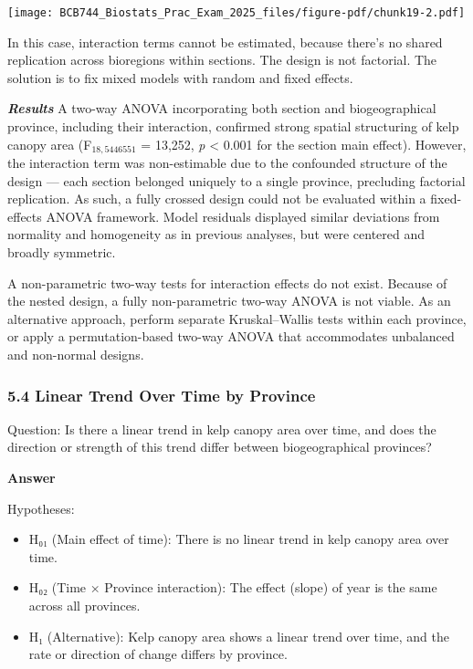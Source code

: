 \documentclass[
  british,
  10pt,
]{article}
\providecommand{\tightlist}{%
  \setlength{\itemsep}{0pt}\setlength{\parskip}{0pt}}
\let\oldtexttt\texttt
\renewcommand{\texttt}[1]{\oldtexttt{\small #1}}
\begin{document}
\begin{center}
\texttt{[image: BCB744\_Biostats\_Prac\_Exam\_2025\_files/figure-pdf/chunk19-2.pdf]}
\end{center}

In this case, interaction terms cannot be estimated, because there's no
shared replication across bioregions within sections. The design is not
factorial. The solution is to fix mixed models with random and fixed
effects.

\textbf{\emph{Results}} A two-way ANOVA incorporating both section and
biogeographical province, including their interaction, confirmed strong
spatial structuring of kelp canopy area (F\(_{18,5446551}\) = 13,252,
\emph{p} \textless{} 0.001 for the section main effect). However, the
interaction term was non-estimable due to the confounded structure of
the design --- each section belonged uniquely to a single province,
precluding factorial replication. As such, a fully crossed design could
not be evaluated within a fixed-effects ANOVA framework. Model residuals
displayed similar deviations from normality and homogeneity as in
previous analyses, but were centered and broadly symmetric.

A non-parametric two-way tests for interaction effects do not exist.
Because of the nested design, a fully non-parametric two-way ANOVA is
not viable. As an alternative approach, perform separate Kruskal--Wallis
tests within each province, or apply a permutation-based two-way ANOVA
that accommodates unbalanced and non-normal designs.

\subsubsection{5.4 Linear Trend Over Time by
Province}\label{linear-trend-over-time-by-province}

Question: Is there a linear trend in kelp canopy area over time, and
does the direction or strength of this trend differ between
biogeographical provinces?

\textbf{Answer}

Hypotheses:

\begin{itemize}
\tightlist
\item
  H₀₁ (Main effect of time): There is no linear trend in kelp canopy
  area over time.
\item
  H₀₂ (Time × Province interaction): The effect (slope) of year is the
  same across all provinces.
\item
  H₁ (Alternative): Kelp canopy area shows a linear trend over time, and
  the rate or direction of change differs by province.
\end{itemize}
\end{document}

